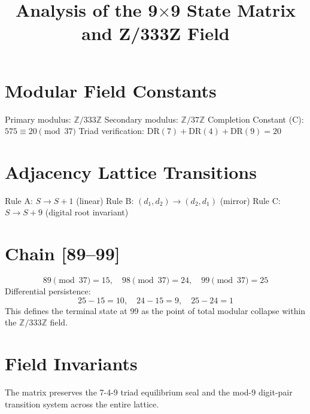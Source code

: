 \documentclass{article}
\begin{document}
\title{Analysis of the 9$\times$9 State Matrix and Z/333Z Field}
\maketitle

\section{Modular Field Constants}
Primary modulus: $\mathbb{Z}/333\mathbb{Z}$
Secondary modulus: $\mathbb{Z}/37\mathbb{Z}$
Completion Constant (C): $575 \equiv 20 \pmod{37}$
Triad verification: $\mathrm{DR}(7) + \mathrm{DR}(4) + \mathrm{DR}(9) = 20$

\section{Adjacency Lattice Transitions}
Rule A: $S \to S + 1$ (linear)
Rule B: $(d_1, d_2) \to (d_2, d_1)$ (mirror)
Rule C: $S \to S + 9$ (digital root invariant)

\section{Chain [89--99]}
\[
89 \pmod{37} = 15, \quad 98 \pmod{37} = 24, \quad 99 \pmod{37} = 25
\]
Differential persistence:
\[
25 - 15 = 10, \quad 24 - 15 = 9, \quad 25 - 24 = 1
\]
This defines the terminal state at 99 as the point of total modular collapse within the $\mathbb{Z}/333\mathbb{Z}$ field.

\section{Field Invariants}
The matrix preserves the 7-4-9 triad equilibrium seal and the mod-9 digit-pair transition system across the entire lattice.
\end{document}
